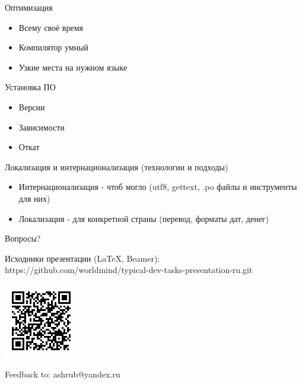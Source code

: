 \documentclass[aspectratio=169]{beamer}
\begin{document}
\begin{frame}{Оптимизация}
\begin{itemize}
\item Всему своё время
\pause
\item Компилятор умный
\pause
\item Узкие места на нужном языке
\end{itemize}
\end{frame}

\begin{frame}{Установка ПО}
\begin{itemize}
\item Версии
\pause
\item Зависимости
\pause
\item Откат
\end{itemize}
\end{frame}

\begin{frame}{Локализация и интернационализация (технологии и подходы)}
\begin{itemize}
\item Интернационализация - чтоб могло (utf8, gettext, .po файлы и инструменты для них)
\pause
\item Локализация - для конкретной страны (перевод, форматы дат, денег)
\end{itemize}
\end{frame}

\begin{frame}{Вопросы?}
\begin{block}{Исходники презентации (LaTeX, Beamer):}
https://github.com/worldmind/typical-dev-tasks-presentation-ru.git
\begin{center}
\includegraphics{qr-git-url.png}
\end{center}
\end{block}
\begin{block}{Feedback to: ashrub@yandex.ru}
\end{block}

\end{frame}
\end{document}
